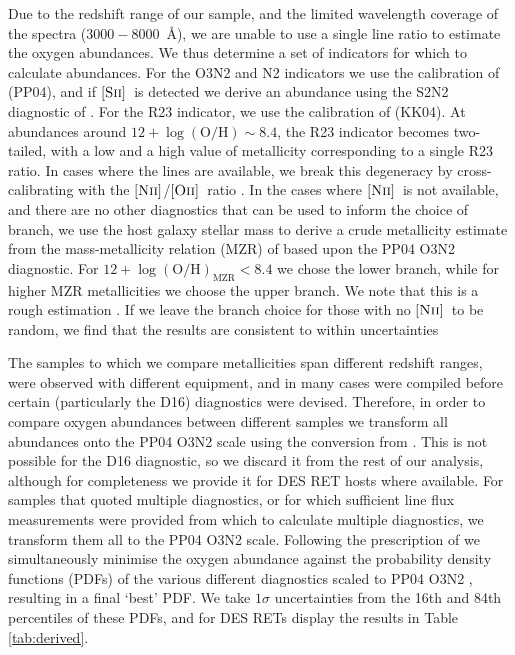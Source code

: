 \documentclass[fleqn,usenatbib,]{mnras}
\newcommand{\replychris}[1]{\color{magenta}#1 \color{black}}
\newcommand{\replylluis}[1]{\color{green}#1 \color{black}}
\newcommand{\OII}[0]{$[\textnormal{\textsc{Oii}}]$}
\newcommand{\SII}[0]{$[\textnormal{\textsc{Sii}}]$}
\newcommand{\NII}[0]{$[\textnormal{\textsc{Nii}}]$}
\begin{document}
Due to the redshift range of our sample, and the limited wavelength coverage of the spectra ($3000-8000$~\AA), we are unable to use a single line ratio to estimate the oxygen abundances. We thus determine a set of indicators for which to calculate abundances. For the O3N2 and N2 indicators we use the calibration of \citet{Pettini2004} (PP04), and if \SII~is detected we derive an abundance using the S2N2 diagnostic of \citet{Dopita2016}. For the R23 indicator, we use the calibration of \citet{Kobulnicky2004} (KK04). At abundances around $12 + \log \mathrm{(O/H)} \sim 8.4$, the R23 indicator becomes two-tailed, with a low and a high value of metallicity corresponding to a single R23 ratio. In cases where the lines are available, we break this degeneracy by cross-calibrating with the \NII/\OII~ratio \citep{Kewley2008}. In the cases where \NII~is not available, and there are no other diagnostics that can be used to inform the choice of branch, we use the host galaxy stellar mass to derive a crude metallicity estimate from the mass-metallicity relation (MZR) of \citet{Kewley2008} based upon the PP04 O3N2 diagnostic. For $12 + \log \mathrm{(O/H)}_{\mathrm{MZR}} < 8.4$ we chose the lower branch, while for higher MZR metallicities we choose the upper branch. \replychris{We note that this is a rough estimation}. If we leave the branch choice for those with no \NII~to be random, we find that the results are consistent to within uncertainties 

The samples to which we compare metallicities span different redshift ranges, were observed with different equipment, and in many cases were compiled before certain (particularly the D16) diagnostics were devised. Therefore, in order to compare oxygen abundances between different samples we transform all abundances onto the PP04 O3N2 scale using the conversion from \citet{Kewley2008}. This is not possible for the D16 diagnostic, so we discard it from the rest of our analysis, although for completeness we provide it for DES RET hosts where available. For samples that quoted multiple diagnostics, or for which sufficient line flux measurements were provided from which to calculate multiple diagnostics, we transform them all to the PP04 O3N2 scale. Following the prescription of \citet{Kruehler2015} we simultaneously minimise the oxygen abundance against the probability density functions (PDFs) of the various different diagnostics \replylluis{scaled to PP04 O3N2}, resulting in a final `best' PDF. We take $1\sigma$ uncertainties from the 16th and 84th percentiles of these PDFs, and \replylluis{for DES RETs} display the results in Table \ref{tab:derived}.
\end{document}
